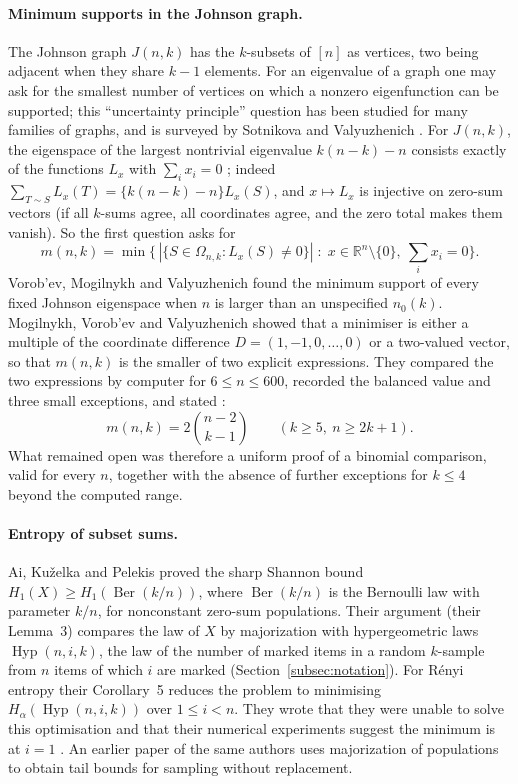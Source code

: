 \documentclass[11pt]{article}
\theoremstyle{remark}
\newcommand{\R}{\mathbb R}
\newcommand{\Hyp}{\operatorname{Hyp}}
\newcommand{\Ber}{\operatorname{Ber}}
\begin{document}
\paragraph{Minimum supports in the Johnson graph.}
The Johnson graph \(J(n,k)\) has the \(k\)-subsets of \([n]\) as vertices,
two being adjacent when they share \(k-1\) elements. For an eigenvalue of a
graph one may ask for the smallest number of vertices on which a nonzero
eigenfunction can be supported; this ``uncertainty principle'' question has
been studied for many families of graphs, and is surveyed by Sotnikova and
Valyuzhenich \cite{SV}. For \(J(n,k)\), the eigenspace of the largest
nontrivial eigenvalue \(k(n-k)-n\) consists exactly of the functions \(L_x\)
with \(\sum_ix_i=0\) \cite{VMV,MVV}; indeed
\(\sum_{T\sim S}L_x(T)=\{k(n-k)-n\}L_x(S)\), and \(x\mapsto L_x\) is
injective on zero-sum vectors (if all \(k\)-sums agree, all coordinates
agree, and the zero total makes them vanish). So the first question asks for
\[
 m(n,k)=\min\bigl\{\,|\{S\in\Omega_{n,k}:L_x(S)\ne0\}|\;:\;x\in\R^n\setminus\{0\},\ \textstyle\sum_ix_i=0\bigr\}.
\]
Vorob'ev, Mogilnykh and Valyuzhenich \cite{VMV} found the minimum support of
every fixed Johnson eigenspace when \(n\) is larger than an unspecified
\(n_0(k)\). Mogilnykh, Vorob'ev and Valyuzhenich \cite{MVV} showed that a
minimiser is either a multiple of the coordinate difference
\(D=(1,-1,0,\ldots,0)\) or a two-valued vector, so that \(m(n,k)\) is the
smaller of two explicit expressions. They compared the two expressions by
computer for \(6\le n\le600\), recorded the balanced value and three small
exceptions, and stated \cite[Conjecture~1]{MVV}:
\[
 m(n,k)=2\binom{n-2}{k-1}\qquad(k\ge5,\ n\ge2k+1).
\]
What remained open was therefore a uniform proof of a binomial comparison,
valid for every \(n\), together with the absence of further exceptions for
\(k\le4\) beyond the computed range.

\paragraph{Entropy of subset sums.}
Ai, Ku\v{z}elka and Pelekis \cite{AKP} proved the sharp Shannon bound
\(H_1(X)\ge H_1(\Ber(k/n))\), where \(\Ber(k/n)\) is the Bernoulli law with
parameter \(k/n\), for nonconstant zero-sum populations. Their argument (their
Lemma~3) compares the law of \(X\) by majorization with hypergeometric laws
\(\Hyp(n,i,k)\), the law of the number of marked items in a random
\(k\)-sample from \(n\) items of which \(i\) are marked (Section~\ref{subsec:notation}).
For R\'enyi entropy their Corollary~5 reduces the problem to minimising
\(H_\alpha(\Hyp(n,i,k))\) over \(1\le i<n\). They wrote that
they were unable to solve this optimisation and that their numerical
experiments suggest the minimum is at \(i=1\) \cite[Section~5]{AKP}. An earlier paper of the same authors \cite{AKP25} uses
majorization of populations to obtain tail bounds for sampling without
replacement.
\end{document}

